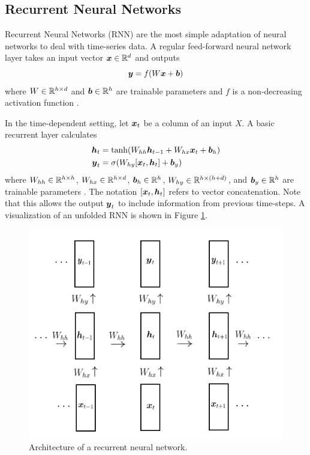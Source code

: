 \subsection{Recurrent Neural Networks}
Recurrent Neural Networks (RNN) are the most simple adaptation of neural networks to deal with time-series data. A regular feed-forward neural network layer takes an input vector $\boldsymbol{x} \in \mathbb{R}^d$ and outputs
\begin{equation}
  \boldsymbol{y} = f( W\boldsymbol{x} + \boldsymbol{b})
  \label{eq:ffn_layer}
\end{equation}
where $W \in \mathbb{R}^{h \times d}$ and $\boldsymbol{b} \in \mathbb{R}^h$ are trainable parameters and $f$ is a non-decreasing activation function \cite{sharma2020}. 

In the time-dependent setting, let $\boldsymbol{x}_t$ be a column of an input $X$. A basic recurrent layer calculates 
\begin{equation}
  \begin{split}
    \boldsymbol{h}_t &= \tanh(W_{hh}\boldsymbol{h}_{t-1} + W_{hx}\boldsymbol{x}_t + \boldsymbol{b}_h) \\
    \boldsymbol{y}_t &= \sigma(W_{hy}[\boldsymbol{x}_t, \boldsymbol{h}_t] + \boldsymbol{b}_y)
\end{split}
  \label{eq:rnn_layer}
\end{equation}
where $W_{hh} \in \mathbb{R}^{h\times h}$, $W_{hx}\in \mathbb{R}^{h\times d}$, $\boldsymbol{b}_h \in \mathbb{R}^h$, $W_{hy} \in \mathbb{R}^{h \times (h+d)}$, and $\boldsymbol{b}_y \in \mathbb{R}^h$ are trainable parameters \cite{elman1990}. The notation $[\boldsymbol{x}_t, \boldsymbol{h}_t]$ refers to vector concatenation. Note that this allows the output $\boldsymbol{y}_t$ to include information from previous time-steps. A visualization of an unfolded RNN is shown in Figure \ref{fig:rnn_visual}.

\begin{figure}[h]
  \centering
  \includegraphics[width=.5\textwidth]{img/rnn_visual.png}
  \caption{Architecture of a recurrent neural network.}
  \label{fig:rnn_visual}
\end{figure}

